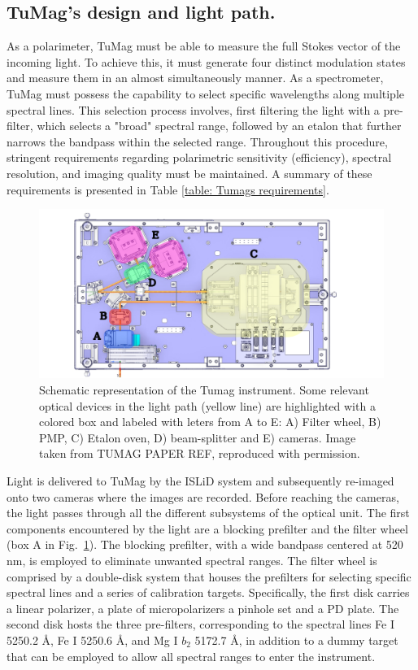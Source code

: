 \subsection{TuMag's design and light path.}

As a polarimeter, TuMag must be able to measure the full Stokes vector of the incoming light. To achieve this, it must generate four distinct modulation states and measure them in an almost simultaneously manner. As a spectrometer, TuMag must possess the capability to select specific wavelengths along multiple spectral lines. This selection process involves, first filtering the light with a pre-filter, which selects a "broad" spectral range, followed by an etalon that further narrows the bandpass within the selected range. Throughout this procedure, stringent requirements regarding polarimetric sensitivity (efficiency), spectral resolution, and imaging quality must be maintained. A summary of these requirements is presented in Table \ref{table: Tumags requirements}.

\begin{figure}[t]
    \includegraphics[width=\textwidth]{figures/TuMag/Scheme.pdf}
    \caption[Tumag schematic.]{Schematic representation of the Tumag instrument. Some relevant optical devices in the light path (yellow line) are highlighted with a colored box and labeled with leters from A to E: A) Filter wheel, B) PMP, C) Etalon oven, D) beam-splitter and E) cameras. Image taken from TUMAG PAPER REF, reproduced with permission.      
    \label{fig_tumag:scheme}}
\end{figure}

Light is delivered to TuMag by the ISLiD system and subsequently re-imaged onto two cameras where the images are recorded. Before reaching the cameras, the light passes through all the different subsystems of the optical unit. The first components encountered by the light are a blocking prefilter and the filter wheel (box A in Fig.~\ref{fig_tumag:scheme}). The blocking prefilter, with a wide bandpass centered at 520 nm, is employed to eliminate unwanted spectral ranges. The filter wheel is comprised by a double-disk system \citep{filter-wheels} that houses the prefilters for selecting specific spectral lines and a series of calibration targets. Specifically, the first disk carries a linear polarizer, a plate of micropolarizers a pinhole set and a PD plate. The second disk hosts the three pre-filters, corresponding to the spectral lines Fe I 5250.2 \r{A}, Fe I 5250.6 \r{A}, and Mg I $b_2$ 5172.7 \r{A}, in addition to a dummy target that can be employed to allow all spectral ranges to enter the instrument.

